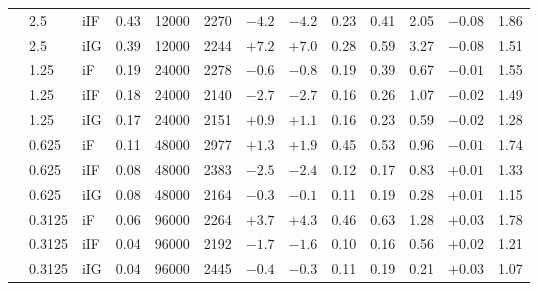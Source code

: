 \begin{tabular}{@{}lllrrrrrrrrrr@{}}
 & 2.5 & iIF & 0.43 & 12000 & 2270 & $-4.2$ & $-4.2$ & 0.23 & 0.41 & 2.05 & $-0.08$ & 1.86 \\
 & 2.5 & iIG & 0.39 & 12000 & 2244 & $+7.2$ & $+7.0$ & 0.28 & 0.59 & 3.27 & $-0.08$ & 1.51 \\
 & 1.25 & iF & 0.19 & 24000 & 2278 & $-0.6$ & $-0.8$ & 0.19 & 0.39 & 0.67 & $-0.01$ & 1.55 \\
 & 1.25 & iIF & 0.18 & 24000 & 2140 & $-2.7$ & $-2.7$ & 0.16 & 0.26 & 1.07 & $-0.02$ & 1.49 \\
 & 1.25 & iIG & 0.17 & 24000 & 2151 & $+0.9$ & $+1.1$ & 0.16 & 0.23 & 0.59 & $-0.02$ & 1.28 \\
 & 0.625 & iF & 0.11 & 48000 & 2977 & $+1.3$ & $+1.9$ & 0.45 & 0.53 & 0.96 & $-0.01$ & 1.74 \\
 & 0.625 & iIF & 0.08 & 48000 & 2383 & $-2.5$ & $-2.4$ & 0.12 & 0.17 & 0.83 & $+0.01$ & 1.33 \\
 & 0.625 & iIG & 0.08 & 48000 & 2164 & $-0.3$ & $-0.1$ & 0.11 & 0.19 & 0.28 & $+0.01$ & 1.15 \\
 & 0.3125 & iF & 0.06 & 96000 & 2264 & $+3.7$ & $+4.3$ & 0.46 & 0.63 & 1.28 & $+0.03$ & 1.78 \\
 & 0.3125 & iIF & 0.04 & 96000 & 2192 & $-1.7$ & $-1.6$ & 0.10 & 0.16 & 0.56 & $+0.02$ & 1.21 \\
 & 0.3125 & iIG & 0.04 & 96000 & 2445 & $-0.4$ & $-0.3$ & 0.11 & 0.19 & 0.21 & $+0.03$ & 1.07 \\
\bottomrule
\end{tabular}
